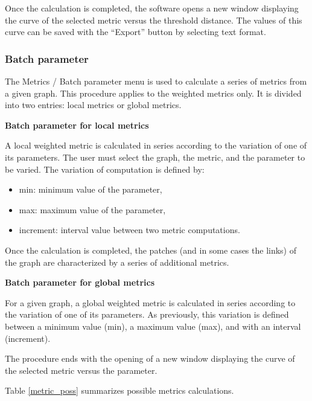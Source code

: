 \documentclass{article}
\begin{document}
Once the calculation is completed, the software opens a new window displaying the curve of the selected metric versus the threshold distance. The values of this curve can be saved with the “Export” button by selecting text format.

\subsubsection{Batch parameter}
\label{batch_metric}
The Metrics / Batch parameter menu is used to calculate a series of metrics from a given graph. This procedure applies to the weighted metrics only. It is divided into two entries: local metrics or global metrics.

\textbf{Batch parameter for local metrics}

A local weighted metric is calculated in series according to the variation of one of its parameters. The user must select the graph, the metric, and the parameter to be varied. The variation of computation is defined by:
\begin{itemize}
	\item min: minimum value of the parameter,
	\item max: maximum value of the parameter,
	\item increment: interval value between two metric computations.
\end{itemize}

Once the calculation is completed, the patches (and in some cases the links) of the graph are characterized by a series of additional metrics.

\textbf{Batch parameter for global metrics}

For a given graph, a global weighted metric is calculated in series according to the variation of one of its parameters. As previously, this variation is defined between a minimum value (min), a maximum value (max), and with an interval (increment). 

The procedure ends with the opening of a new window displaying the curve of the selected metric versus the parameter. 

Table \ref{metric_poss} summarizes possible metrics calculations.
\end{document}
